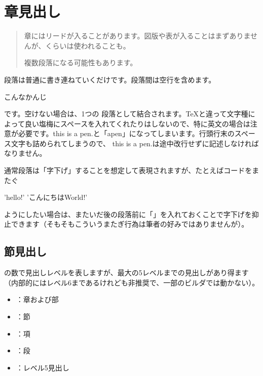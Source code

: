 \chapter{章見出し}
\label{chap:ch01}

\begin{quotation}
章にはリードが入ることがあります。図版や表が入ることはまずありませんが、くらいは使われることも。

複数段落になる可能性もあります。
\end{quotation}

段落は普通に書き連ねていくだけです。段落間は空行を含めます。

こんなかんじ

です。空けない場合は、1つの
段落として結合されます。TeXと違って文字種によって良い塩梅にスペースを入れてくれたりはしないので、特に英文の場合は注意が必要です。this is a
pen.と「apen」になってしまいます。行頭行末のスペース文字も詰められてしまうので、
this is a pen.は途中改行せずに記述しなければなりません。

通常段落は「字下げ」することを想定して表現されますが、たとえばコードをまたぐ

\begin{reviewlistblock}
\begin{reviewemlist}
'hello!' 'こんにちはWorld!'
\end{reviewemlist}
\end{reviewlistblock}

\noindent
ようにしたい場合は、またいだ後の段落前に「」を入れておくことで字下げを抑止できます（そもそもこういうまたぎ行為は筆者の好みではありませんが）。

\section{節見出し}
\label{sec:1-1}

\reviewtt{=}の数で見出しレベルを表しますが、最大\reviewtt{=====}の5レベルまでの見出しがあり得ます（内部的にはレベル6まであるけれども非推奨で、一部のビルダでは動かない）。

\begin{itemize}
\item \reviewtt{=}：章および部
\item \reviewtt{==}：節
\item \reviewtt{===}：項
\item \reviewtt{====}：段
\item \reviewtt{=====}：レベル5見出し
\end{itemize}

